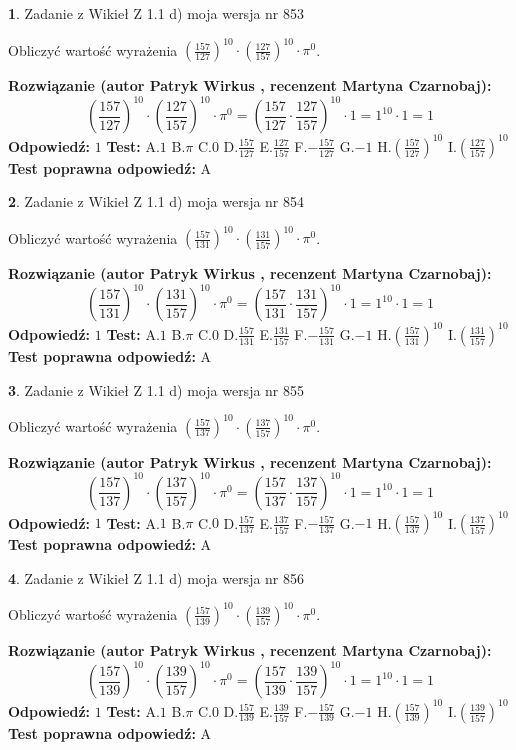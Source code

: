 \documentclass[12pt, a4paper]{article}
\theoremstyle{definition} %
\newtheorem{zad}{}
\newcommand{\zadStart}[1]{\begin{zad}#1\newline}
\newcommand{\zadStop}{\end{zad}}
\newcommand{\rozwStart}[2]{\noindent \textbf{Rozwiązanie (autor #1 , recenzent #2): }\newline}
\newcommand{\rozwStop}{\newline}
\newcommand{\odpStart}{\noindent \textbf{Odpowiedź:}\newline}
\newcommand{\odpStop}{\newline}
\newcommand{\testStart}{\noindent \textbf{Test:}\newline}
\newcommand{\testStop}{\newline}
\newcommand{\kluczStart}{\noindent \textbf{Test poprawna odpowiedź:}\newline}
\newcommand{\kluczStop}{\newline}
\begin{document}
\zadStart{Zadanie z Wikieł Z 1.1 d) moja wersja nr 853}

Obliczyć wartość wyrażenia $(\frac{157}{127})^{10} \cdot (\frac{127}{157})^{10} \cdot \pi^{0}$.
\zadStop
\rozwStart{Patryk Wirkus}{Martyna Czarnobaj}
$$(\frac{157}{127})^{10} \cdot (\frac{127}{157})^{10} \cdot \pi^{0} = (\frac{157}{127} \cdot \frac{127}{157})^{10} \cdot 1 = 1^{10} \cdot 1 = 1$$
\rozwStop
\odpStart
$1$
\odpStop
\testStart
A.$1$ B.$\pi$ C.$0$ D.$\frac{157}{127}$ E.$\frac{127}{157}$
F.$-\frac{157}{127}$ G.$-1$
H.$(\frac{157}{127})^{10}$
I.$(\frac{127}{157})^{10}$
\testStop
\kluczStart
A
\kluczStop



\zadStart{Zadanie z Wikieł Z 1.1 d) moja wersja nr 854}

Obliczyć wartość wyrażenia $(\frac{157}{131})^{10} \cdot (\frac{131}{157})^{10} \cdot \pi^{0}$.
\zadStop
\rozwStart{Patryk Wirkus}{Martyna Czarnobaj}
$$(\frac{157}{131})^{10} \cdot (\frac{131}{157})^{10} \cdot \pi^{0} = (\frac{157}{131} \cdot \frac{131}{157})^{10} \cdot 1 = 1^{10} \cdot 1 = 1$$
\rozwStop
\odpStart
$1$
\odpStop
\testStart
A.$1$ B.$\pi$ C.$0$ D.$\frac{157}{131}$ E.$\frac{131}{157}$
F.$-\frac{157}{131}$ G.$-1$
H.$(\frac{157}{131})^{10}$
I.$(\frac{131}{157})^{10}$
\testStop
\kluczStart
A
\kluczStop



\zadStart{Zadanie z Wikieł Z 1.1 d) moja wersja nr 855}

Obliczyć wartość wyrażenia $(\frac{157}{137})^{10} \cdot (\frac{137}{157})^{10} \cdot \pi^{0}$.
\zadStop
\rozwStart{Patryk Wirkus}{Martyna Czarnobaj}
$$(\frac{157}{137})^{10} \cdot (\frac{137}{157})^{10} \cdot \pi^{0} = (\frac{157}{137} \cdot \frac{137}{157})^{10} \cdot 1 = 1^{10} \cdot 1 = 1$$
\rozwStop
\odpStart
$1$
\odpStop
\testStart
A.$1$ B.$\pi$ C.$0$ D.$\frac{157}{137}$ E.$\frac{137}{157}$
F.$-\frac{157}{137}$ G.$-1$
H.$(\frac{157}{137})^{10}$
I.$(\frac{137}{157})^{10}$
\testStop
\kluczStart
A
\kluczStop



\zadStart{Zadanie z Wikieł Z 1.1 d) moja wersja nr 856}

Obliczyć wartość wyrażenia $(\frac{157}{139})^{10} \cdot (\frac{139}{157})^{10} \cdot \pi^{0}$.
\zadStop
\rozwStart{Patryk Wirkus}{Martyna Czarnobaj}
$$(\frac{157}{139})^{10} \cdot (\frac{139}{157})^{10} \cdot \pi^{0} = (\frac{157}{139} \cdot \frac{139}{157})^{10} \cdot 1 = 1^{10} \cdot 1 = 1$$
\rozwStop
\odpStart
$1$
\odpStop
\testStart
A.$1$ B.$\pi$ C.$0$ D.$\frac{157}{139}$ E.$\frac{139}{157}$
F.$-\frac{157}{139}$ G.$-1$
H.$(\frac{157}{139})^{10}$
I.$(\frac{139}{157})^{10}$
\testStop
\kluczStart
A
\kluczStop
\end{document}
